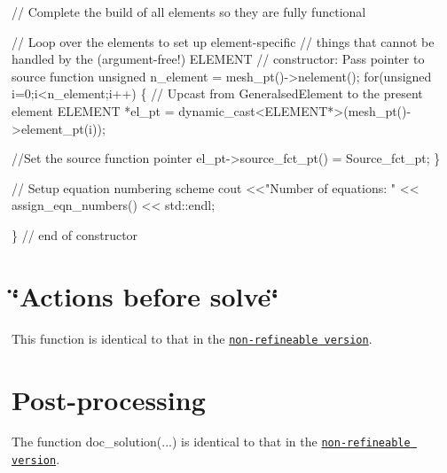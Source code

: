 \begin{DoxyCodeInclude}
 \textcolor{comment}{// Complete the build of all elements so they are fully functional}

 \textcolor{comment}{// Loop over the elements to set up element-specific }
 \textcolor{comment}{// things that cannot be handled by the (argument-free!) ELEMENT }
 \textcolor{comment}{// constructor: Pass pointer to source function}
 \textcolor{keywordtype}{unsigned} n\_element = mesh\_pt()->nelement();
 \textcolor{keywordflow}{for}(\textcolor{keywordtype}{unsigned} i=0;i<n\_element;i++)
  \{
   \textcolor{comment}{// Upcast from GeneralsedElement to the present element}
   ELEMENT *el\_pt = \textcolor{keyword}{dynamic\_cast<}ELEMENT*\textcolor{keyword}{>}(mesh\_pt()->element\_pt(i));

   \textcolor{comment}{//Set the source function pointer}
   el\_pt->source\_fct\_pt() = Source\_fct\_pt;
  \}

 \textcolor{comment}{// Setup equation numbering scheme}
 cout <<\textcolor{stringliteral}{"Number of equations: "} << assign\_eqn\_numbers() << std::endl; 

\} \textcolor{comment}{// end of constructor}

\end{DoxyCodeInclude}




 

\hypertarget{index_actions_before}{}\section{\char`\"{}\+Actions before solve\char`\"{}}\label{index_actions_before}
This function is identical to that in the \href{../../../poisson/two_d_poisson/html/index.html}{\tt non-\/refineable version}.



 

\hypertarget{index_doc}{}\section{Post-\/processing}\label{index_doc}
The function {\ttfamily doc\+\_\+solution}(...) is identical to that in the \href{../../../poisson/two_d_poisson/html/index.html}{\tt non-\/refineable version}.



 

